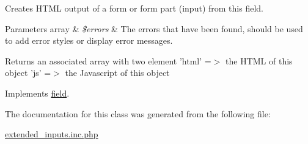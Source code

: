 Creates H\-T\-M\-L output of a form or form part (input) from this field. 


\begin{DoxyParams}[1]{Parameters}
array & {\em \$errors} & The errors that have been found, should be used to add error styles or display error messages. \\
\hline
\end{DoxyParams}
\begin{DoxyReturn}{Returns}
an associated array with two element 'html' =$>$ the H\-T\-M\-L of this object 'js' =$>$ the Javascript of this object 
\end{DoxyReturn}


Implements \hyperlink{interfacefield_a1b51c4b8b01f77a26eda359e1fc0fb4c}{field}.



The documentation for this class was generated from the following file\-:\begin{DoxyCompactItemize}
\item 
\hyperlink{extended__inputs_8inc_8php}{extended\-\_\-inputs.\-inc.\-php}\end{DoxyCompactItemize}
